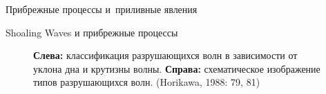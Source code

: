 \begin{chapter}{Прибрежные процессы и~приливные явления}
\begin{section}{Shoaling Waves и прибрежные процессы}
\begin{figure}[t!]
\begin{centering}
\end{centering}
\caption{\textbf{Слева:} классификация 
разрушающихся волн в зависимости от уклона дна и крутизны волны. 
\textbf{Справа:} схематическое изображение типов разрушающихся волн. 
(Horikawa, 1988: 79, 81)}
\label{fig:breakers}
\end{figure}
%
%


\end{section}
\end{chapter}
